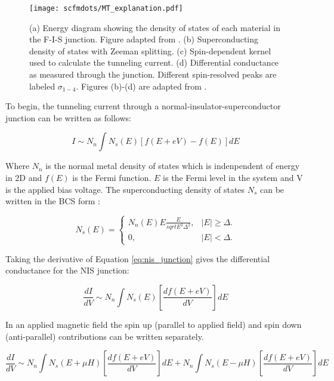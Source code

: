 \begin{figure}
    \centering
    \texttt{[image: scfmdots/MT\_explanation.pdf]}
    \caption{(a) Energy diagram showing the density of states of each material in the F-I-S junction. Figure adapted from \cite{Moodera2010}. (b) Superconducting density of states with Zeeman splitting. (c) Spin-dependent kernel used to calculate the tunneling current. (d) Differential conductance as measured through the junction. Different spin-resolved peaks are labeled $\sigma_{1-4}$. Figures (b)-(d) are adapted from \cite{Meservey1994}.}
    \label{fig:MT_explanation}
\end{figure}

To begin, the tunneling current through a normal-insulator-superconductor junction can be written as follows:

\begin{equation}
    \label{eq:nis_junction}
    I \sim N_n \int N_s(E)[f(E+eV) - f(E)]dE
\end{equation}

Where $N_n$ is the normal metal density of states which is indenpendent of energy in 2D and $f(E)$ is the Fermi function. $E$ is the Fermi level in the system and V is the applied bias voltage. The superconducting density of states $N_s$ can be written in the BCS form \cite{Tinkham1996}:

\begin{equation}
    \label{eq:bcs_dos}
    N_s(E) = \begin{cases}
    N_n(E)E\frac{E}{sqrt{E^2 \Delta^2}}, & |E| \geq \Delta.\\
    0, & |E| < \Delta.
  \end{cases}
\end{equation}

Taking the derivative of Equation \ref{eq:nis_junction} gives the differential conductance for the NIS junction:

\begin{equation}
    \label{eq:nis_diffcond}
    \frac{dI}{dV} \sim N_n \int N_s(E)[\frac{df(E+eV)}{dV}]dE
\end{equation}

In an applied magnetic field the spin up (parallel to applied field) and spin down (anti-parallel) contributions can be written separately.

\begin{equation}
    \label{eq:nis_diffcond_field}
    \frac{dI}{dV} \sim N_n \int N_s(E+\mu H)[\frac{df(E+eV)}{dV}]dE + N_n \int N_s(E-\mu H)[\frac{df(E+eV)}{dV}]dE
\end{equation}

